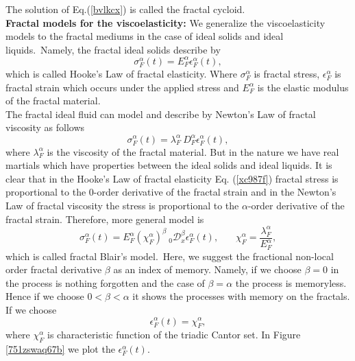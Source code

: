 \documentclass[12pt]{article}
\begin{document}
 The solution of Eq.(\ref{bvlkcx}) is called the  fractal cycloid.\\
 \textbf{Fractal models for the viscoelasticity:} We generalize the viscoelasticity models to the fractal mediums in the case of ideal solids and ideal liquids.~Namely, the fractal  ideal solids  describe by
 \begin{equation}\label{xc987f}
   \sigma_{F}^{\alpha}(t)=E_{F}^{\alpha}\epsilon_{F}^{\alpha}(t),
 \end{equation}
 which is called  Hooke's Law of fractal elasticity. Where $\sigma_{F}^{\alpha}$ is fractal stress, $\epsilon_{F}^{\alpha}$ is fractal strain which occurs under the applied stress and $E_{F}^{\alpha}$ is the elastic modulus of the fractal material.\\
 The fractal ideal fluid can model and describe  by  Newton's Law of fractal viscosity  as follows
 \begin{equation}\label{963u}
  \sigma_{F}^{\alpha}(t)=\lambda_{F}^{\alpha}~D_{F}^{\alpha} \epsilon_{F}^{\alpha}(t),
 \end{equation}
 where $\lambda_{F}^{\alpha}$ is the viscosity of the fractal material. But in the nature we have real martials which have properties between the ideal solids and ideal liquids. It is clear that  in the Hooke's Law of fractal elasticity Eq. (\ref{xc987f}) fractal stress is proportional to the $0$-order derivative of the fractal strain and in the Newton's Law of fractal viscosity the stress is proportional to the $\alpha$-order derivative of the fractal strain. Therefore, more general  model is
 \begin{equation}\label{wqer39}
   \sigma_{F}^{\alpha}(t)=E_{F}^{\alpha} (\chi_{F}^{\alpha})^{\beta}~ _{0}\mathcal{D}_{x}^{\beta} \epsilon_{F}^{\alpha}(t),~~~~~~~~\chi_{F}^{\alpha}=\frac{\lambda_{F}^{\alpha}}{E_{F}^{\alpha}},
 \end{equation}
which is called fractal Blair's model.~Here, we suggest the fractional non-local order fractal derivative  $\beta$ as an index of memory. Namely, if we choose $\beta=0$ in the process is nothing forgotten  and the case of $\beta=\alpha$  the process is memoryless. Hence if we choose  $0<\beta<\alpha$ it shows the processes with memory on the fractals.\\ If we choose
\begin{equation}\label{cd}
  \epsilon_{F}^{\alpha}(t)=\chi_{F}^{\alpha},
\end{equation}
where $\chi_{F}^{\alpha}$ is characteristic function of the triadic Cantor set. In Figure \ref{751zswaq67b} we plot the $\epsilon_{F}^{\alpha}(t)$.
\end{document}
